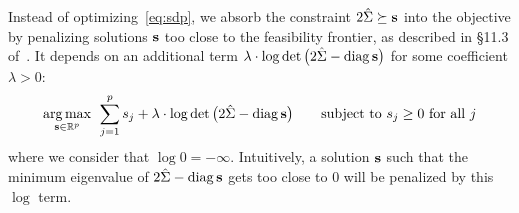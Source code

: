 Instead of optimizing~\ref{eq:sdp},
we absorb the constraint $2\hat{\Sigma} \succeq \mathbf{s}$ into the objective by penalizing solutions
$\mathbf{s}$ too close to the feasibility frontier, as described in §11.3 of~\cite{convex_optimization}.
It depends on an additional term
$\lambda \cdot \log\det\big( 2\hat{\Sigma} - \operatorname*{diag}\mathbf{s} \big)$
for some coefficient $\lambda > 0$:
\begin{equation}\label{eq:sdp_log_barrier}
    \underset{\mathbf{s} \in \mathbb{R}^p}{\operatorname*{arg\,max}}\;\,
    \sum_{j = 1}^p s_j
    + \lambda \cdot \log\det\big( 2\hat{\Sigma} - \operatorname*{diag}\mathbf{s} \big)
    \qquad
    \text{subject to }
    s_j \geq 0\text{ for all } j
\end{equation}
where we consider that $\log 0 = -\infty$.
Intuitively, a solution $\mathbf{s}$ such that the minimum eigenvalue of $2\hat{\Sigma} - \operatorname*{diag}\mathbf{s}$ gets too close to $0$
will be penalized by this $\log$ term.

